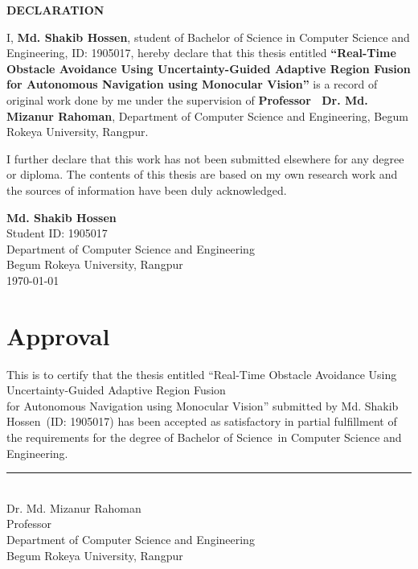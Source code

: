 \documentclass[12pt,oneside]{book}
\newcommand{\thesistitle}{Real-Time Obstacle Avoidance Using Uncertainty-Guided Adaptive Region Fusion\\for Autonomous Navigation using Monocular Vision}
\newcommand{\theauthor}{Md. Shakib Hossen}
\newcommand{\thedegree}{Bachelor of Science}
\newcommand{\themajor}{Computer Science and Engineering}
\newcommand{\thesupervisor}{ Dr. Md. Mizanur Rahoman}
\newcommand{\thesupervisortitle}{Professor}
\newcommand{\thedepartment}{Department of Computer Science and Engineering}
\newcommand{\theuniversity}{Begum Rokeya University, Rangpur}
\begin{document}


\thispagestyle{empty}
\vspace*{1cm}

\begin{center}
    {\Large\bfseries DECLARATION}
\end{center}

\vspace{0.8cm}

I, \textbf{\theauthor}, student of Bachelor of Science in Computer Science and Engineering, ID: 1905017, hereby declare that this thesis entitled \textbf{``\thesistitle''} is a record of original work done by me under the supervision of \textbf{\thesupervisortitle~\thesupervisor}, Department of Computer Science and Engineering, Begum Rokeya University, Rangpur.

\vspace{0.8cm}

I further declare that this work has not been submitted elsewhere for any degree or diploma. The contents of this thesis are based on my own research work and the sources of information have been duly acknowledged.

\vspace{2cm}

\begin{flushright}
    \textbf{\theauthor}\\
    Student ID: 1905017\\
    Department of Computer Science and Engineering\\
    Begum Rokeya University, Rangpur\\
    \today
\end{flushright}

\clearpage

\chapter*{Approval}
\thispagestyle{empty}
This is to certify that the thesis entitled ``\thesistitle'' submitted by \theauthor\ (ID: 1905017) has been accepted as satisfactory in partial fulfillment of the requirements for the degree of \thedegree\ in \themajor.

\vspace{3cm}
\noindent
\rule{7cm}{0.5pt}\\
\thesupervisor\\
\thesupervisortitle\\
\thedepartment\\
\theuniversity
\end{document}
